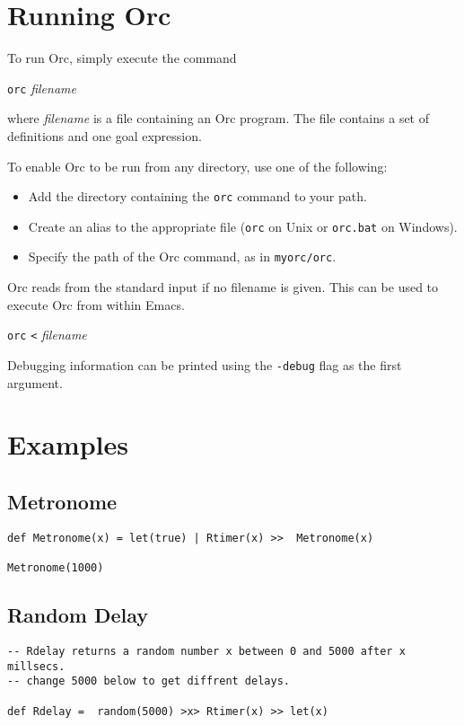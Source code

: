 \documentclass{article}
\newcommand{\s}[1]{{\it{#1}}}
\begin{document}
\section{Running Orc}

To run Orc, simply execute the command

{\tt orc} \s{filename}

\noindent
where \s{filename} is a file containing an Orc program.
The file contains a set of definitions  and one goal expression.

To enable Orc to be run from any directory, use one of the following:
\begin{itemize}
\item Add the directory containing the {\tt orc} command to your path.
\item Create an alias to the appropriate file ({\tt orc} on Unix or {\tt orc.bat} on Windows).
\item Specify the path of the Orc command, as in {\tt myorc/orc}.
\end{itemize}

Orc reads from the standard input if no filename is given. This can be used to execute
Orc from within Emacs.

{\tt orc} {\tt <} \s{filename}

Debugging information can be printed using the {\tt -debug} flag as the first argument.

\section{Examples}

\subsection{Metronome}
\begin{verbatim}
def Metronome(x) = let(true) | Rtimer(x) >>  Metronome(x)

Metronome(1000)
\end{verbatim}

\subsection{Random Delay}
\begin{verbatim}
-- Rdelay returns a random number x between 0 and 5000 after x millsecs.
-- change 5000 below to get diffrent delays.

def Rdelay =  random(5000) >x> Rtimer(x) >> let(x)
\end{verbatim}
\end{document}
